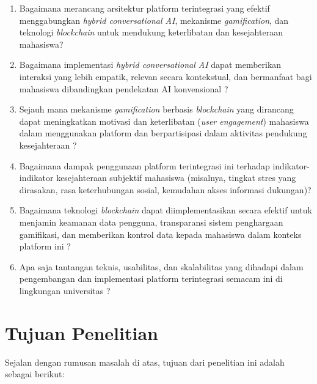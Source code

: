 \begin{enumerate}
    \item Bagaimana merancang arsitektur platform terintegrasi yang efektif menggabungkan \textit{hybrid conversational AI}, mekanisme \textit{gamification}, dan teknologi \textit{blockchain} untuk mendukung keterlibatan dan kesejahteraan mahasiswa?
    \item Bagaimana implementasi \textit{hybrid conversational AI} dapat memberikan interaksi yang lebih empatik, relevan secara kontekstual, dan bermanfaat bagi mahasiswa dibandingkan pendekatan AI konvensional \cite{empathetic_conversational_agents_mental_health_2024}?
    \item Sejauh mana mekanisme \textit{gamification} berbasis \textit{blockchain} yang dirancang dapat meningkatkan motivasi dan keterlibatan (\textit{user engagement}) mahasiswa dalam menggunakan platform dan berpartisipasi dalam aktivitas pendukung kesejahteraan \cite{gamification_engagement_moderating_concentration_2024}?
    \item Bagaimana dampak penggunaan platform terintegrasi ini terhadap indikator-indikator kesejahteraan subjektif mahasiswa (misalnya, tingkat stres yang dirasakan, rasa keterhubungan sosial, kemudahan akses informasi dukungan)?
    \item Bagaimana teknologi \textit{blockchain} dapat diimplementasikan secara efektif untuk menjamin keamanan data pengguna, transparansi sistem penghargaan gamifikasi, dan memberikan kontrol data kepada mahasiswa dalam konteks platform ini \cite{blockchain_education_transforming_2024}?
    \item Apa saja tantangan teknis, usabilitas, dan skalabilitas yang dihadapi dalam pengembangan dan implementasi platform terintegrasi semacam ini di lingkungan universitas \cite{integrated_metaverse_blockchain_ai_education_2025}?
\end{enumerate}


\section{Tujuan Penelitian}
\label{sec:tujuan_penelitian}

\noindent Sejalan dengan rumusan masalah di atas, tujuan dari penelitian ini adalah sebagai berikut:

